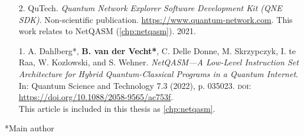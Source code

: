 \begin{enumerate}[label={\arabic*.},itemsep=0.7\baselineskip,parsep=0.3\baselineskip]
    \item[2.]
        QuTech.
        \textit{Quantum Network Explorer Software Development Kit (QNE SDK)}.
        Non-scientific publication.
        \url{https://www.quantum-network.com}.
        This work relates to NetQASM (\cref{chp:netqasm}).
        2021.

    \item[1.]
        A. Dahlberg*, \textbf{B. van der Vecht*}, C. Delle Donne, M. Skrzypczyk, I. te Raa, W. Kozlowski, and S. Wehner.
        \textit{NetQASM---A Low-Level Instruction Set Architecture for Hybrid Quantum-Classical Programs in a Quantum Internet}.
        In: Quantum Science and Technology 7.3 (2022), p. 035023.
        {\small \textsc{doi:}} \url{https://doi.org/10.1088/2058-9565/ac753f}.
        \\ \ficon This article is included in this thesis as \cref{chp:netqasm}.
\end{enumerate}

\vskip 5mm
\centerline{*Main author}

\begin{xstretch}
\printbibliography[heading=subbibintoc,title={References},notcategory=noprint]
\end{xstretch}
